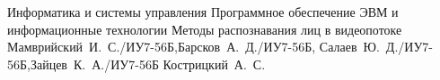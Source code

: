 \documentclass{bmstu}
\begin{document}
	
	\makeresearchtitle
    {Информатика и системы управления} %
    {Программное обеспечение ЭВМ и информационные технологии} %
    {Методы распознавания лиц в видеопотоке} %
    {Мамврийский~И.~С./ИУ7-56Б,Барсков~А.~Д./ИУ7-56Б, Салаев~Ю.~Д./ИУ7-56Б,Зайцев~К.~А./ИУ7-56Б} %
    {Кострицкий~А.~С.} %
    {} %
	
	\setcounter{page}{3}
    \maketableofcontents
	
	
	
	
	
	
	

    \makebibliography
\end{document}
